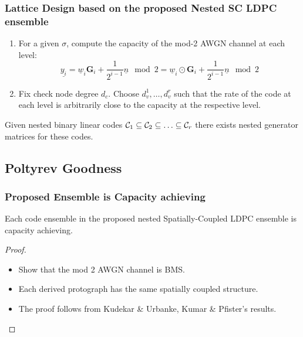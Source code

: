 \documentclass[10pt]{beamer}
\begin{document}
\begin{frame}\frametitle{Lattice Design based on the proposed Nested SC LDPC ensemble}
\begin{enumerate}
\item For a given $\sigma$, compute the capacity of the mod-2 AWGN channel at each level:
		$$
         \underline{y_{i}}= \underline{w}_i \mathbf{G}_i +\frac{1}{2^{i-1}} \underline{n}\mod 2=\underline{w}_i \odot \mathbf{G}_i + \boxed{\frac{1}{2^{i-1}}\underline{n} \mod 2}
         $$
         \vspace{0.08in}

\item Fix check node degree $d_{c}$. Choose $d_{v}^{1},\ldots ,d_{v}^{r}$ such that the rate of the code at each level is arbitrarily close to the capacity at the respective level.
\end{enumerate}
\pause
\begin{lemma}\label{lemma:nested_G}
    Given nested binary linear codes $\mathcal{C}_{1}\subseteq \mathcal{C}_{2}\subseteq\ldots \subseteq\mathcal{C}_{r}$ there exists nested generator matrices for these codes.
\end{lemma}
\end{frame}

\subsection{Poltyrev Goodness}
\begin{frame}\frametitle{Proposed Ensemble is Capacity achieving}
\begin{theorem}
Each code ensemble in the proposed nested Spatially-Coupled LDPC ensemble is capacity achieving. 
\end{theorem}    
\begin{proof}
\begin{itemize}
        \item Show that the mod 2 AWGN channel is BMS.
        \item Each derived protograph has the same spatially coupled structure.
        \item The proof follows from Kudekar \& Urbanke, Kumar \& Pfister's  results.
    \end{itemize}
\end{proof}
\end{frame}
\end{document}
